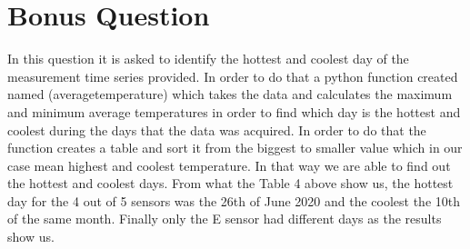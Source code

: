 \documentclass[a4paper,12pt]{article}
\begin{document}
\section{Bonus Question}
In this question it is asked to identify the hottest and coolest day of the measurement time series provided. In order to do that a python function created named (averagetemperature) which takes the data and calculates the maximum and minimum average temperatures in order to find which day is the hottest and coolest during the days that the data was acquired. In order to do that the function creates a table and sort it from the biggest to smaller value which in our case mean highest and coolest temperature. In that way we are able to find out the hottest and coolest days. From what the Table 4 above show us, the hottest day for the 4 out of 5 sensors was the 26th of June 2020 and the coolest the 10th of the same month. Finally only the E sensor had different days as the results show us.
\end{document}
